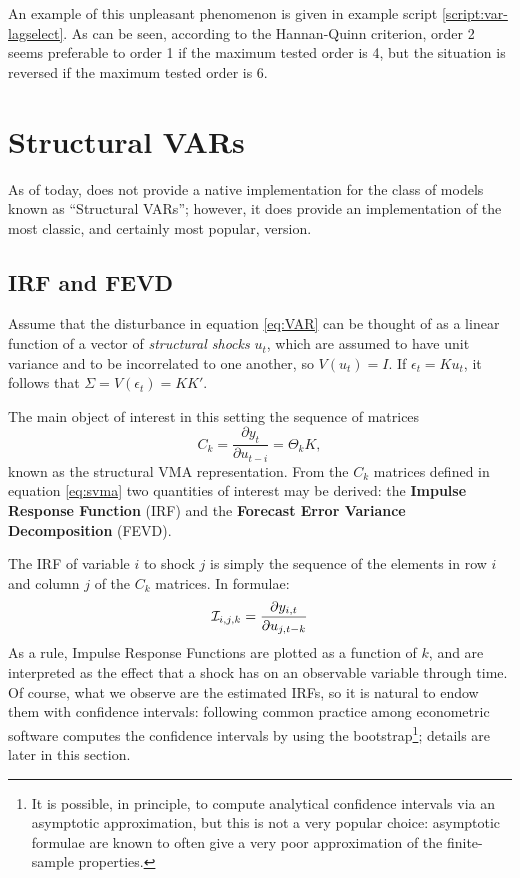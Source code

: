An example of this unpleasant phenomenon is given in example script
\ref{script:var-lagselect}. As can be seen, according to the
Hannan-Quinn criterion, order 2 seems preferable to order 1 if the
maximum tested order is 4, but the situation is reversed if the
maximum tested order is 6.

\section{Structural VARs}
\label{sec:svar}

As of today,  does not provide a native implementation for
the class of models known as ``Structural VARs''; however, it does
provide an implementation of the most classic, and certainly most
popular, version. 

\subsection{IRF and FEVD}

Assume that the disturbance in equation \eqref{eq:VAR} can be thought
of as a linear function of a vector of \emph{structural shocks} $u_t$,
which are assumed to have unit variance and to be incorrelated to one
another, so $V(u_t) = I$. If $\epsilon_t = K u_t$, it follows that
$\Sigma = V(\epsilon_t) = KK'$.

The main object of interest in this setting the sequence of matrices
\begin{equation}
  \label{eq:svma}
  C_k = \frac{\partial y_t}{\partial u_{t-i}} = \Theta_k K, 
\end{equation}
known as the structural VMA representation. From the $C_k$ matrices
defined in equation \eqref{eq:svma} two quantities of interest may be
derived: the \textbf{Impulse Response Function} (IRF) and the
\textbf{Forecast Error Variance Decomposition} (FEVD).

The IRF of variable $i$ to shock $j$ is simply the sequence of the
elements in row $i$ and column $j$ of the $C_k$ matrices. In formulae:
\[
  \mathcal{I}_{i,j,k} = \frac{\partial y_{i,t}}{\partial u_{j, t-k}}
\]
As a rule, Impulse Response Functions are plotted as a function of
$k$, and are interpreted as the effect that a shock has on an
observable variable through time. Of course, what we observe are the
estimated IRFs, so it is natural to endow them with confidence
intervals: following common practice among econometric software
 computes the confidence intervals by using the
bootstrap\footnote{It is possible, in principle, to compute analytical
  confidence intervals via an asymptotic approximation, but this is
  not a very popular choice: asymptotic formulae are known to often
  give a very poor approximation of the finite-sample properties.};
details are later in this section.

